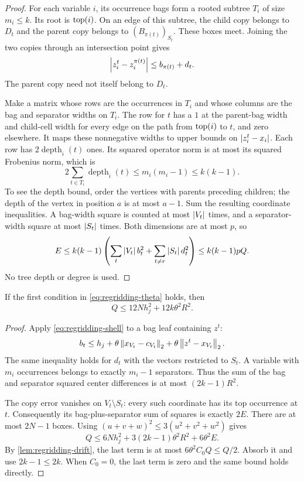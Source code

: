 \begin{proof}
For each variable $i$, its occurrence bags form a rooted subtree $T_i$
of size $m_i\le k$. Its root is $\operatorname{top}(i)$. On an edge of this
subtree, the child copy belongs to $D_t$ and the parent copy belongs
to $(B_{\pi(t)})_{S_t}$. These boxes meet. Joining the two copies
through an intersection point gives
\[
 \left\lvert z_i^t-z_i^{\pi(t)}\right\rvert\le b_{\pi(t)}+d_t.
\]
The parent copy need not itself belong to $D_t$.

Make a matrix whose rows are the occurrences in $T_i$ and whose
columns are the bag and separator widths on $T_i$. The row for $t$
has a $1$ at the parent-bag width and child-cell width for every edge
on the path from $\operatorname{top}(i)$ to $t$, and zero elsewhere. It maps
these nonnegative widths to upper bounds on $\left\lvert z_i^t-x_i\right\rvert$.
Each row has $2\operatorname{depth}_i(t)$ ones. Its squared operator
norm is at most its squared Frobenius norm, which is
\[
 2\sum_{t\in T_i}\operatorname{depth}_i(t)
 \le m_i(m_i-1)\le k(k-1).
\]
To see the depth bound, order the vertices with parents preceding
children; the depth of the vertex in position $a$ is at most $a-1$.
Sum the resulting coordinate inequalities. A bag-width square is
counted at most $\left\lvert V_t\right\rvert$ times, and a separator-width square at
most $\left\lvert S_t\right\rvert$ times. Both dimensions are at most $p$, so
\[
 E\le k(k-1)\left(\sum_t\left\lvert V_t\right\rvert b_t^2+
                   \sum_{t\ne r}\left\lvert S_t\right\rvert d_t^2\right)
 \le k(k-1)pQ.
\]
No tree depth or degree is used.
\end{proof}

\begin{lemma}\label{lem:regridding-grading}
If the first condition in \eqref{eq:regridding-theta} holds, then
\begin{equation}\label{eq:regridding-grading}
 Q\le12Nh_j^2+12k\theta^2R^2.
\end{equation}
\end{lemma}

\begin{proof}
Apply \eqref{eq:regridding-shell} to a bag leaf containing $z^t$:
\[
 b_t\le h_j+\theta\left\lVert x_{V_t}-c_{V_t}\right\rVert_2
                    +\theta\left\lVert z^t-x_{V_t}\right\rVert_2.
\]
The same inequality holds for $d_t$ with the vectors restricted to
$S_t$. A variable with $m_i$ occurrences belongs to exactly $m_i-1$
separators. Thus the sum of the bag and separator squared center
differences is at most $(2k-1)R^2$.

The copy error vanishes on $V_t\setminus S_t$: every such coordinate
has its top occurrence at $t$. Consequently its bag-plus-separator
sum of squares is exactly $2E$. There are at most $2N-1$ boxes.
Using $(u+v+w)^2\le3(u^2+v^2+w^2)$ gives
\[
 Q\le6Nh_j^2+3(2k-1)\theta^2R^2+6\theta^2E.
\]
By \cref{lem:regridding-drift}, the last term is at most
$6\theta^2C_0Q\le Q/2$. Absorb it and use $2k-1\le2k$.
When $C_0=0$, the last term is zero and the same bound holds directly.
\end{proof}

